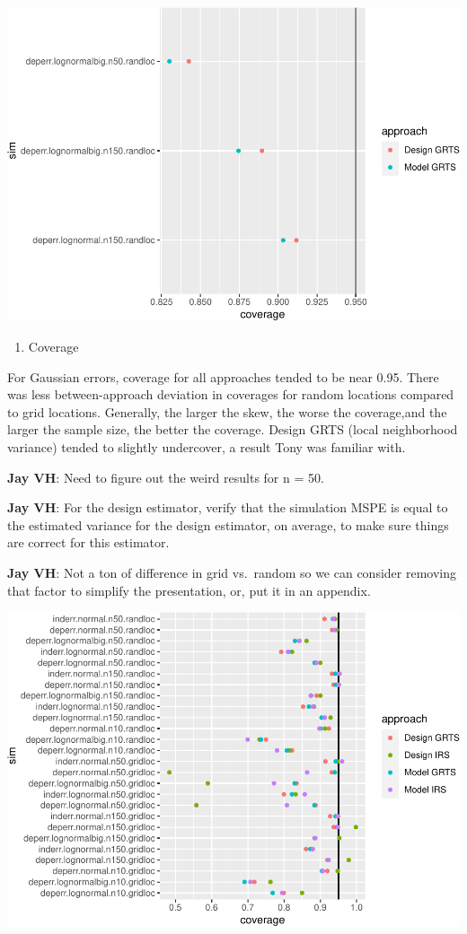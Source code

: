 \documentclass[]{elsarticle} %
\providecommand{\tightlist}{%
  \setlength{\itemsep}{0pt}\setlength{\parskip}{0pt}}
\begin{document}
\includegraphics{SpatialDVM_Manuscript_files/figure-latex/unnamed-chunk-6-1.pdf}

\begin{enumerate}
\def\labelenumi{\arabic{enumi}.}
\setcounter{enumi}{3}
\tightlist
\item
  Coverage
\end{enumerate}

For Gaussian errors, coverage for all approaches tended to be near 0.95.
There was less between-approach deviation in coverages for random
locations compared to grid locations. Generally, the larger the skew,
the worse the coverage,and the larger the sample size, the better the
coverage. Design GRTS (local neighborhood variance) tended to slightly
undercover, a result Tony was familiar with.

\textbf{Jay VH}: Need to figure out the weird results for n = 50.

\textbf{Jay VH}: For the design estimator, verify that the simulation
MSPE is equal to the estimated variance for the design estimator, on
average, to make sure things are correct for this estimator.

\textbf{Jay VH}: Not a ton of difference in grid vs.~random so we can
consider removing that factor to simplify the presentation, or, put it
in an appendix.

\includegraphics{SpatialDVM_Manuscript_files/figure-latex/unnamed-chunk-7-1.pdf}
\end{document}
